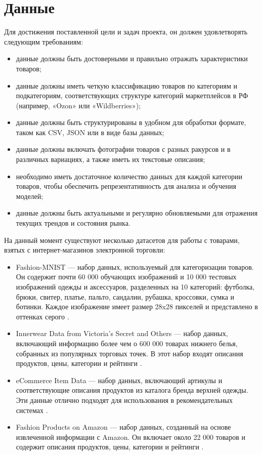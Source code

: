 \documentclass[a4paper,12pt]{extarticle}
\begin{document}
\newpage
\section{Данные} 

Для достижения поставленной цели и задач проекта, он должен удовлетворять следующим требованиям:
\begin{itemize}
	\item данные должны быть достоверными и правильно отражать характеристики товаров;
	\item данные должны иметь четкую классификацию товаров по категориям и подкатегориям, соответствующих структуре категорий маркетплейсов в РФ (например, «Ozon» или «Wildberries»);
	\item данные должны быть структурированы в удобном для обработки формате, таком как CSV, JSON или в виде базы данных;
	\item данные должны включать фотографии товаров с разных ракурсов и в различных вариациях, а также иметь их текстовые описания;
	\item необходимо иметь достаточное количество данных для каждой категории товаров, чтобы обеспечить репрезентативность для анализа и обучения моделей;
	\item данные должны быть актуальными и регулярно обновляемыми для отражения текущих трендов и состояния рынка.
\end{itemize}

На данный момент существуют несколько датасетов для работы с товарами, взятых с интернет-магазинов электронной торговли:
\begin{itemize}
	\item Fashion-MNIST — набор данных, используемый для категоризации товаров. Он содержит почти 60 000 обучающих изображений и 10 000 тестовых изображений одежды и аксессуаров, разделенных на 10 категорий: футболка, брюки, свитер, платье, пальто, сандалии, рубашка, кроссовки, сумка и ботинки. Каждое изображение имеет размер 28x28 пикселей и представлено в оттенках серого \cite{fashion_mnist}.
	\item Innerwear Data from Victoria's Secret and Others — набор данных, включающий информацию более чем о 600 000 товарах нижнего белья, собранных из популярных торговых точек. В этот набор входят описания продуктов, цены, категории и рейтинги \cite{victoria_secret_data}.
	\item eCommerce Item Data — набор данных, включающий артикулы и соответствующие описания продуктов из каталога бренда верхней одежды. Эти данные отлично подходят для использования в рекомендательных системах \cite{eсommerce_item_data}.
	\item Fashion Products on Amazon — набор данных, созданный на основе извлеченной информации с Amazon. Он включает около 22 000 товаров и содержит описания продуктов, цены, категории и рейтинги \cite{amazon_data}.
\end{itemize}
\end{document}
